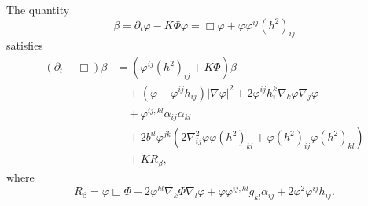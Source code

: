 \documentclass{amsart}
\begin{document}
\begin{lemma}
\label{lem:evbeta}
The quantity
\[
\beta = \partial_t \varphi - K\Phi\varphi = \Box\varphi +  \varphi\varphi^{ij} (h^2)_{ij}
\]
satisfies
\[
\begin{split}
(\partial_{t} - \Box)\beta &= \left(\varphi^{ij}(h^2)_{ij} + K\Phi \right)\beta \\
&\quad + (\varphi - \varphi^{ij}h_{ij}) |\nabla\varphi|^{2} + 2\varphi^{ij}h^{k}_{i}\nabla_k \varphi \nabla_j \varphi \\
&\quad + \varphi^{ij,kl} \alpha_{ij} \alpha_{kl} \\
&\quad + 2b^{il}\varphi^{jk} (2\nabla^2_{ij}\varphi\varphi(h^2)_{kl} + \varphi(h^2)_{ij}\varphi(h^2)_{kl}) \\
&\quad + KR_{\beta},
\end{split}
\]
where
\[
R_{\beta} = \varphi \Box \Phi + 2\varphi^{kl} \nabla_k \Phi \nabla_l \varphi + \varphi \varphi^{ij,kl}g_{kl} \alpha_{ij} + 2\varphi^{2}\varphi^{ij}h_{ij}.
\]
\end{lemma}
\end{document}
